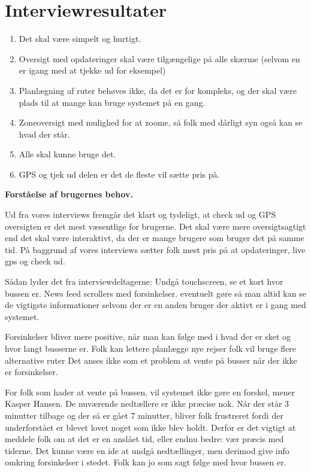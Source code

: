 \documentclass[12pt,a4paper,oneside]{article}
\begin{document}
\section{Interviewresultater}

\begin{enumerate}
\item{Det skal være simpelt og hurtigt.}
\item{Oversigt med opdateringer skal være tilgængelige på alle skærme (selvom en er igang med at tjekke ud for eksempel)}
\item{Planlægning af ruter behøves ikke, da det er for kompleks, og der skal være plads til at mange kan bruge systemet på en gang.}
\item{Zoneoversigt med mulighed for at zoome, så folk med dårligt syn også kan se hvad der står.}
\item{Alle skal kunne bruge det.}
\item{GPS og tjek ud delen er det de fleste vil sætte pris på.}
\end{enumerate}

\textbf{Forståelse af brugernes behov.}

Ud fra vores interviews fremgår det klart og tydeligt, at check ud og GPS oversigten er det mest væsentlige for brugerne.
Det skal være mere oversigtsagtigt end det skal være interaktivt, da der er mange brugere som bruger det på samme tid.
På baggrund af vores interviews sætter folk mest pris på at opdateringer, live gps og check ud.\newline


Sådan lyder det fra interviewdeltagerne: 
Undgå touchscreen, se et kort hvor bussen er.
News feed scrollers med forsinkelser.
eventuelt gøre så man altid kan se de vigtigste informationer selvom der er en anden bruger der aktivt er i gang med systemet.\newline


Forsinkelser bliver mere positive, når man kan følge med i hvad der er sket og hvor langt busserne er.
Folk kan lettere planlægge nye rejser
folk vil bruge flere alternative ruter
Det anses ikke som et problem at vente på busser når der ikke er forsinkelser.\newline

For folk som hader at vente på bussen, vil systemet ikke gøre en forskel, mener Kasper Hansen.
De nuværende nedtællere er ikke præcise nok. Når der står 3 minutter tilbage og der så er gået 7 minutter, bliver folk frustreret fordi der underforstået er blevet lovet noget som ikke blev holdt. Derfor er det vigtigt at meddele folk om at det er en anslået tid, eller endnu bedre: vær præcis med tiderne. 
Det kunne være en ide at undgå nedtællinger, men derimod give info omkring forsinkelser i stedet. Folk kan jo som sagt følge med hvor bussen er.
\end{document}
